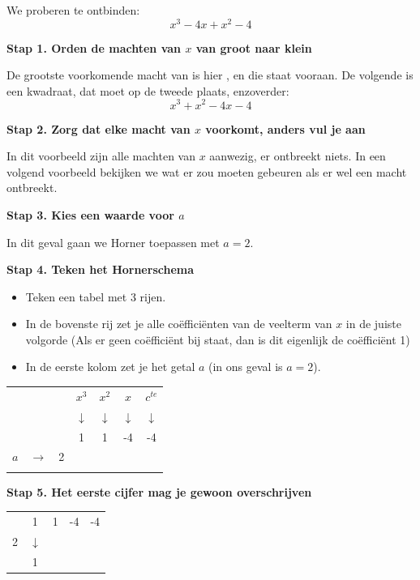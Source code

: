 \begin{voorbeeld}
We proberen te ontbinden:
\begin{equation*}
x^3-4x+x^2-4
\end{equation*}

\textbf{Stap 1. Orden de machten van $x$ van groot naar klein}

De grootste voorkomende macht van  is hier , en die staat vooraan. De volgende is een kwadraat, dat moet op de tweede plaats, enzoverder: 
\begin{equation*}
x^3+x^2-4x-4
\end{equation*}

\textbf{Stap 2. Zorg dat elke macht van $x$ voorkomt, anders vul je aan}

In dit voorbeeld zijn alle machten van $x$ aanwezig, er ontbreekt niets. In een volgend voorbeeld bekijken we wat er zou moeten gebeuren als er wel een macht ontbreekt.

\textbf{Stap 3. Kies een waarde voor $a$}

In dit geval gaan we Horner toepassen met $a=2$.

\textbf{Stap 4. Teken het Hornerschema}

\begin{itemize}
	\item Teken een tabel met 3 rijen. 
	\item In de bovenste rij zet je alle co\"effici\"enten van de veelterm van $x$ in de juiste volgorde (Als er geen co\"effici\"ent bij  staat, dan is dit eigenlijk de co\"effici\"ent 1) 
	\item In de eerste kolom zet je het getal $a$ (in ons geval is $a=2$).
\end{itemize}

\begin{center}
	\begin{tabular}{ccc|cccc}
	& & & $x^3$ & $x^2$ & $x$ & $c^{te}$ \\
	& & & $\downarrow$ & $\downarrow$ & $\downarrow$ & $\downarrow$\\
	& & & 1 & 1 & -4 & -4 \\
	$a$ & $\rightarrow$ & 2 & & & & \\
	\hline 
	& & & & & & 
	\end{tabular}
\end{center}


\textbf{Stap 5. Het eerste cijfer mag je gewoon overschrijven}

\begin{center}
	\begin{tabular}{c|cccc}
		 & 1 & 1 & -4 & -4 \\
		2 & $\downarrow$ & & & \\
		\hline 
		 & 1 & & & 
	\end{tabular}
\end{center}



\end{voorbeeld}
